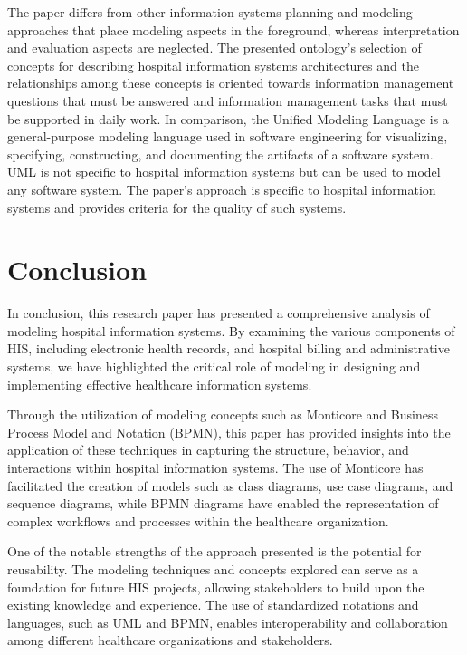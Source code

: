 The paper differs from other information systems planning and modeling approaches that place modeling aspects in the foreground, whereas interpretation and evaluation aspects are neglected. The presented ontology's selection of concepts for describing hospital information systems architectures and the relationships among these concepts is oriented towards information management questions that must be answered and information management tasks that must be supported in daily work. In comparison, the Unified Modeling Language is a general-purpose modeling language used in software engineering for visualizing, specifying, constructing, and documenting the artifacts of a software system. UML is not specific to hospital information systems but can be used to model any software system. The paper's approach is specific to hospital information systems and provides criteria for the quality of such systems.\cite{UHIS}

\let\cleardoublepage\clearpage
\chapter{Conclusion}
In conclusion, this research paper has presented a comprehensive analysis of modeling hospital information systems. By examining the various components of HIS, including electronic health records, and hospital billing and administrative systems, we have highlighted the critical role of modeling in designing and implementing effective healthcare information systems.

Through the utilization of modeling concepts such as Monticore and Business Process Model and Notation (BPMN), this paper has provided insights into the application of these techniques in capturing the structure, behavior, and interactions within hospital information systems. The use of Monticore has facilitated the creation of models such as class diagrams, use case diagrams, and sequence diagrams, while BPMN diagrams have enabled the representation of complex workflows and processes within the healthcare organization.

One of the notable strengths of the approach presented is the potential for reusability. The modeling techniques and concepts explored can serve as a foundation for future HIS projects, allowing stakeholders to build upon the existing knowledge and experience. The use of standardized notations and languages, such as UML and BPMN, enables interoperability and collaboration among different healthcare organizations and stakeholders.

